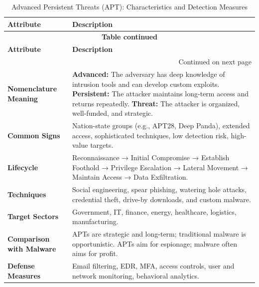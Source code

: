 \renewcommand{\arraystretch}{1.4}
\begin{longtable}{|p{4cm}|p{11cm}|}
\caption{Advanced Persistent Threats (APT): Characteristics and Detection Measures} \\
\hline
\rowcolor{gray!20} \textbf{Attribute} & \textbf{Description} \\
\hline
\endfirsthead

\multicolumn{2}{c}{{\bfseries Table continued}} \\
\hline
\rowcolor{gray!20} \textbf{Attribute} & \textbf{Description} \\
\hline
\endhead

\hline \multicolumn{2}{r}{{Continued on next page}} \\
\endfoot

\hline
\endlastfoot

\textbf{Nomenclature Meaning} & \textbf{Advanced:} The adversary has deep knowledge of intrusion tools and can develop custom exploits. \newline
\textbf{Persistent:} The attacker maintains long-term access and returns repeatedly. \newline
\textbf{Threat:} The attacker is organized, well-funded, and strategic. \\
\hline

\textbf{Common Signs} & Nation-state groups (e.g., APT28, Deep Panda), extended access, sophisticated techniques, low detection risk, high-value targets. \\
\hline

\textbf{Lifecycle} & Reconnaissance → Initial Compromise → Establish Foothold → Privilege Escalation → Lateral Movement → Maintain Access → Data Exfiltration. \\
\hline

\textbf{Techniques} & Social engineering, spear phishing, watering hole attacks, credential theft, drive-by downloads, and custom malware. \\
\hline

\textbf{Target Sectors} & Government, IT, finance, energy, healthcare, logistics, manufacturing. \\
\hline

\textbf{Comparison with Malware} & APTs are strategic and long-term; traditional malware is opportunistic. APTs aim for espionage; malware often aims for profit. \\
\hline

\textbf{Defense Measures} & Email filtering, EDR, MFA, access controls, user and network monitoring, behavioral analytics. \\
\hline
\end{longtable}

